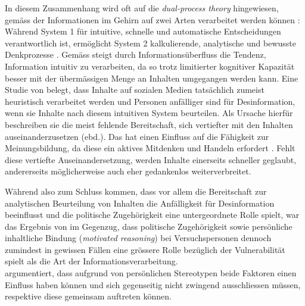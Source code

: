 \documentclass[12pt,a4paper]{article}        %
\begin{document}
In diesem Zusammenhang wird oft auf die \textit{dual-process theory} hingewiesen, gemäss der Informationen im Gehirn auf zwei Arten verarbeitet werden können \parencite[40]{pennycook_lazy_2019}: Während System 1 für intuitive, schnelle und automatische Entscheidungen verantwortlich ist, ermöglicht System 2 kalkulierende, analytische und bewusste Denkprozesse \parencite[249]{hohlfeld_schlechte_2020}. Gemäss \textcite[487]{schaewitz_when_2020} steigt durch Informationsüberfluss die Tendenz, Information intuitiv zu verarbeiten, da so trotz limitierter kognitiver Kapazität besser mit der übermässigen Menge an Inhalten umgegangen werden kann.
Eine Studie von \textcite[48]{pennycook_lazy_2019} belegt, dass Inhalte auf sozialen Medien tatsächlich zumeist heuristisch verarbeitet werden und Personen anfälliger sind für Desinformation, wenn sie Inhalte nach diesem intuitiven System beurteilen. Als Ursache hierfür beschreiben sie die meist fehlende Bereitschaft, sich vertiefter mit den Inhalten auseinanderzusetzen (ebd.). Das hat einen Einfluss auf die Fähigkeit zur Meinungsbildung, da diese ein aktives Mitdenken und Handeln erfordert \parencite[216]{schmidt_meinungsbildung_2022}. Fehlt diese vertiefte Auseinandersetzung, werden Inhalte einerseits schneller geglaubt, andererseits möglicherweise auch eher gedankenlos weiterverbreitet.

Während \citeauthor{pennycook_lazy_2019} also zum Schluss kommen, dass vor allem die Bereitschaft zur analytischen Beurteilung von Inhalten die Anfälligkeit für Desinformation beeinflusst und die politische Zugehörigkeit eine untergeordnete Rolle spielt, war das Ergebnis von \textcite[502]{schaewitz_when_2020} im Gegenzug, dass politische Zugehörigkeit sowie persönliche inhaltliche Bindung (\textit{motivated reasoning}) bei Versuchspersonen dennoch zumindest in gewissen Fällen eine grössere Rolle bezüglich der Vulnerabilität spielt als die Art der Informationsverarbeitung. \\
\textcite[24]{zoglauer_konstruierte_2021} argumentiert, dass aufgrund von persönlichen Stereotypen beide Faktoren einen Einfluss haben können und sich gegenseitig nicht zwingend ausschliessen müssen, respektive diese gemeinsam auftreten können.
\end{document}
